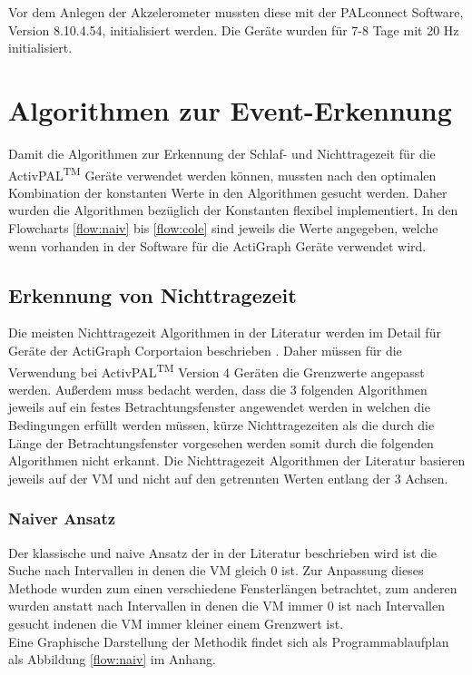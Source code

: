 Vor dem Anlegen der Akzelerometer mussten diese mit der PALconnect Software, Version 8.10.4.54, initialisiert werden. Die Geräte wurden für 7-8 Tage mit 20 Hz initialisiert.



\section{Algorithmen zur Event-Erkennung}
Damit die Algorithmen zur Erkennung der Schlaf- und Nichttragezeit für die ActivPAL\textsuperscript{TM} Geräte verwendet werden können, mussten nach den optimalen Kombination der konstanten Werte in den Algorithmen gesucht werden. Daher wurden die Algorithmen bezüglich der Konstanten flexibel implementiert. In den Flowcharts \ref{flow:naiv} bis \ref{flow:cole} sind jeweils die Werte angegeben, welche wenn vorhanden in der Software für die ActiGraph Geräte verwendet wird. %



\subsection{Erkennung von Nichttragezeit}
Die meisten Nichttragezeit Algorithmen in der Literatur werden im Detail für Geräte der ActiGraph Corportaion beschrieben \cite{Choi2012} \cite{TROIANO2008}. Daher müssen für die Verwendung bei ActivPAL\textsuperscript{TM} Version 4 Geräten die Grenzwerte angepasst werden. Außerdem muss bedacht werden, dass die 3 folgenden Algorithmen jeweils auf ein festes Betrachtungsfenster angewendet werden in welchen die Bedingungen erfüllt werden müssen, kürze Nichttragezeiten als die durch die Länge der Betrachtungsfenster vorgesehen werden somit durch die folgenden Algorithmen nicht erkannt. Die Nichttragezeit Algorithmen der Literatur basieren jeweils auf der \ac{VM} und nicht auf den getrennten Werten entlang der 3 Achsen.



\subsubsection{Naiver Ansatz}
Der klassische und naive Ansatz der in der Literatur beschrieben wird \cite{Choi2012} ist die Suche nach Intervallen in denen die \ac{VM} gleich 0 ist. Zur Anpassung dieses Methode wurden zum einen verschiedene Fensterlängen betrachtet, zum anderen wurden anstatt nach Intervallen in denen die \ac{VM} immer 0 ist nach Intervallen  gesucht indenen die \ac{VM} immer kleiner einem Grenzwert ist.\\
Eine Graphische Darstellung der Methodik findet sich als Programmablaufplan als Abbildung \ref{flow:naiv} im Anhang.



